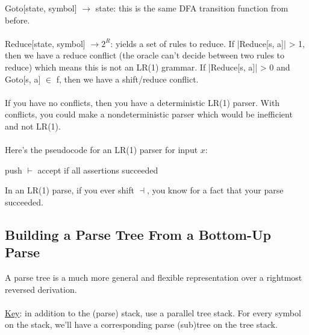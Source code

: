 \documentclass[]{article}
\DeclarePairedDelimiter{\set}{\lbrace}{\rbrace}
\theoremstyle{definition}
\newcommand{\lecture}[1]{\marginpar{{\footnotesize $\leftarrow$ \underline{#1}}}}
\begin{document}
				Goto[state, symbol] $\to$ state: this is the same DFA transition function from before.
				\\ \\
				Reduce[state, symbol] $\to 2^R$: yields a set of rules to reduce. If |Reduce[s, a]| > 1, then we have a reduce conflict (the oracle can't decide between two rules to reduce) which means this is not an LR(1) grammar. If |Reduce[s, a]| > 0 and Goto[s, a] $\in$ f, then we have a shift/reduce conflict.
				\\ \\
				If you have no conflicts, then you have a deterministic LR(1) parser. With conflicts, you could make a nondeterministic parser which would be inefficient and not LR(1).
				\\ \\
				Here's the pseudocode for an LR(1) parser for input $x$: \\
				\begin{algorithm}[H]
					push $\vdash$\;
					accept if all assertions succeeded\;
				\end{algorithm}
				
				In an LR(1) parse, if you ever shift $\dashv$, you know for a fact that your parse succeeded.
		\subsection{Building a Parse Tree From a Bottom-Up Parse} \lecture{March 11, 2013}
			A parse tree is a much more general and flexible representation over a rightmost reversed derivation.
			\\ \\
			\underline{Key}: in addition to the (parse) stack, use a parallel tree stack. For every symbol on the stack, we'll have a corresponding parse (sub)tree on the tree stack.
			
\end{document}
